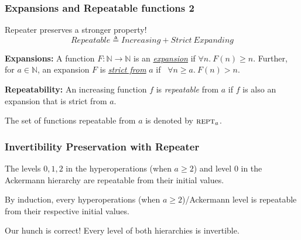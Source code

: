 \begin{frame}
\frametitle{Expansions and Repeatable functions 2}

%
%
%

Repeater preserves a stronger property!
\begin{equation*}
Repeatable \triangleq Increasing + Strict \ Expanding
\end{equation*}

\textbf{Expansions:} A function $F:\mathbb{N}\to\mathbb{N}$ is an
\href{https://github.com/inv-ack/inv-ack/blob/7270e64a2600b771f2b1b1b151f7d13fb2ae6c97/increasing_expanding.v\#L80-L82}{\emph{expansion}} if $\forall n.~ F(n)\ge n$. Further, for $a\in \mathbb{N}$, an expansion $F$ is
\href{https://github.com/inv-ack/inv-ack/blob/7270e64a2600b771f2b1b1b151f7d13fb2ae6c97/increasing_expanding.v\#L84-L86}{\emph{strict from}} $a$ if ~$\forall n \ge a.~ F(n) > n$.

\bigskip

\textbf{Repeatability:} An increasing function $f$ is \emph{repeatable} from $a$ if $f$ is also an expansion that is strict from $a$.

\smallskip

The set of functions repeatable from $a$ is denoted by $\text{\scshape{rept}}_a$.

\end{frame}


\begin{frame}
\frametitle{Invertibility Preservation with Repeater}
\label{frame:repeatable2}


\bigskip

The levels $0, 1, 2$ in the hyperoperations (when $a\ge 2$) and level $0$ in the Ackermann hierarchy are repeatable from their initial values.

\bigskip

By induction, every hyperoperations (when $a\ge 2$)/Ackermann level is repeatable from their respective initial values.

\bigskip

Our hunch is correct! Every level of both hierarchies is invertible.

\end{frame}


